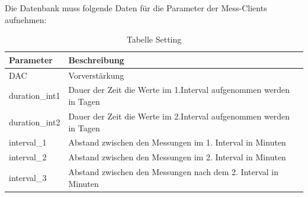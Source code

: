 Die Datenbank muss folgende Daten für die Parameter der Mess-Clients aufnehmen:\\

\begin{table}[H]
\begin{center}
\begin{tabular}{|l|l|}\hline
Parameter & Beschreibung \\ \hline
DAC & Vorverstärkung\\ 
duration\_int1 & Dauer der Zeit die Werte im 1.Interval aufgenommen werden in Tagen\\ 
duration\_int2 & Dauer der Zeit die Werte im 2.Interval aufgenommen werden in Tagen\\ 
interval\_1 & Abstand zwischen den Messungen im 1. Interval in Minuten\\ 
interval\_2 & Abstand zwischen den Messungen im 2. Interval in Minuten\\ 
interval\_3 & Abstand zwischen den Messungen nach dem 2. Interval in Minuten\\ \hline
\end{tabular}
\caption{Tabelle Setting}
\label{table_TabelleSetting}
\end{center}
\end{table}




